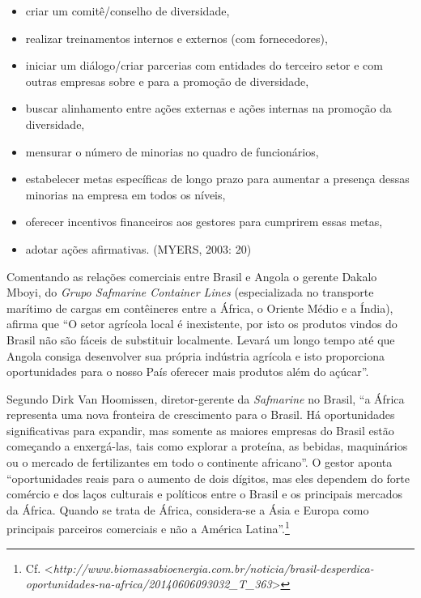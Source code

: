 \begin{itemize}
\item criar um comitê/conselho de diversidade,

\item realizar treinamentos internos e externos (com fornecedores),

\item iniciar um diálogo/criar parcerias com entidades do terceiro setor e
com outras empresas sobre e para a promoção de diversidade,

\item buscar alinhamento entre ações externas e ações internas na promoção
da diversidade,

\item mensurar o número de minorias no quadro de funcionários,

\item estabelecer metas específicas de longo prazo para aumentar a presença
dessas minorias na empresa em todos os níveis,

\item oferecer incentivos financeiros aos gestores para cumprirem essas
metas,

\item adotar ações afirmativas. (MYERS, 2003: 20)
\end{itemize}

Comentando as relações comerciais entre Brasil e Angola o gerente Dakalo
Mboyi, do \emph{Grupo Safmarine Container Lines} (especializada no
transporte marítimo de cargas em contêineres entre a África, o Oriente
Médio e a Índia), afirma que ``O setor agrícola local é inexistente, por
isto os produtos vindos do Brasil não são fáceis de substituir
localmente. Levará um longo tempo até que Angola consiga desenvolver sua
própria indústria agrícola e isto proporciona oportunidades para o nosso
País oferecer mais produtos além do açúcar''.

Segundo Dirk Van Hoomissen, diretor-gerente da \emph{Safmarine} no
Brasil, ``a África representa uma nova fronteira de crescimento para o
Brasil. Há oportunidades significativas para expandir, mas somente as
maiores empresas do Brasil estão começando a enxergá-las, tais como
explorar a proteína, as bebidas, maquinários ou o mercado de
fertilizantes em todo o continente africano''. O gestor aponta
``oportunidades reais para o aumento de dois dígitos, mas eles dependem
do forte comércio e dos laços culturais e políticos entre o Brasil e os
principais mercados da África. Quando se trata de África, considera-se a
Ásia e Europa como principais parceiros comerciais e não a América
Latina''.\footnote{Cf.
  \textless{}\emph{http://www.biomassabioenergia.com.br/noticia/brasil-desperdica-oportunidades-na-africa/20140606093032\_T\_363}\textgreater{}}

